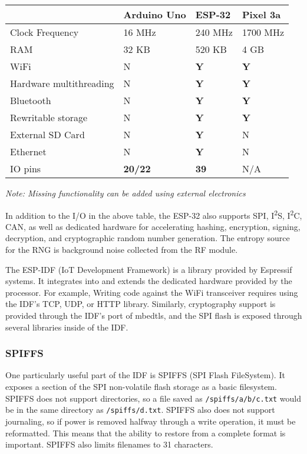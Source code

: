 \documentclass{article}
\begin{document}
\begin{table}[h]
\begin{tabular}{l|lll}
						& Arduino Uno		& ESP-32		& Pixel 3a		\\ \hline
Clock Frequency			& 16 MHz			& 240 MHz		& 1700 MHz		\\ \hline
RAM						& 32 KB				& 520 KB		& 4 GB			\\ \hline
WiFi 					& N 				& \textbf{Y}	& \textbf{Y}	\\ \hline
Hardware multithreading	& N 				& \textbf{Y}	& \textbf{Y}	\\ \hline
Bluetooth				& N 				& \textbf{Y}	& \textbf{Y}	\\ \hline
Rewritable storage		& N 				& \textbf{Y}	& \textbf{Y}	\\ \hline
External SD Card		& N 				& \textbf{Y}	& N				\\ \hline
Ethernet				& N 				& \textbf{Y}	& N				\\ \hline
IO pins					& \textbf{20/22}	& \textbf{39}	& N/A			\\

\end{tabular}
\end{table}

\emph{Note: Missing functionality can be added using external electronics}

In addition to the I/O in the above table, the ESP-32 also supports SPI, I\textsuperscript{2}S, I\textsuperscript{2}C, CAN, as well as dedicated hardware for accelerating hashing, encryption, signing, decryption, and cryptographic random number generation.
The entropy source for the RNG is background noise collected from the RF module.

The ESP-IDF (IoT Development Framework) is a library provided by Espressif systems. It integrates into and extends the dedicated hardware provided by the processor.
For example, Writing code against the WiFi transceiver requires using the IDF's TCP, UDP, or HTTP library.
Similarly, cryptography support is provided through the IDF's port of mbedtls, and the SPI flash is exposed through several libraries inside of the IDF.

\subsubsection{SPIFFS}

One particularly useful part of the IDF is SPIFFS (SPI Flash FileSystem).
It exposes a section of the SPI non-volatile flash storage as a basic filesystem.
SPIFFS does not support directories, so a file saved as \texttt{/spiffs/a/b/c.txt} would be in the same directory as \texttt{/spiffs/d.txt}.
SPIFFS also does not support journaling, so if power is removed halfway through a write operation, it must be reformatted.
This means that the ability to restore from a complete format is important.
SPIFFS also limits filenames to 31 characters.
\end{document}
